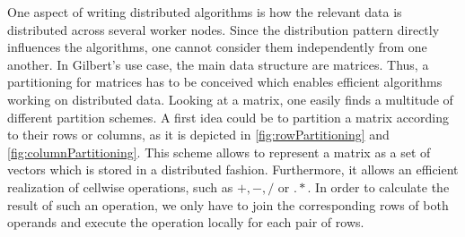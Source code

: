 One aspect of writing distributed algorithms is how the relevant data is distributed across several worker nodes. Since the distribution pattern directly influences the algorithms, one cannot consider them independently from one another. In Gilbert's use case, the main data structure are matrices. Thus, a partitioning for matrices has to be conceived which enables efficient algorithms working on distributed data. Looking at a matrix, one easily finds a multitude of different partition schemes. A first idea could be to partition a matrix according to their rows or columns, as it is depicted in \cref{fig:rowPartitioning} and \cref{fig:columnPartitioning}. This scheme allows to represent a matrix as a set of vectors which is stored in a distributed fashion.
Furthermore, it allows an efficient realization of cellwise operations, such as $+,-,/$ or $.*$. In order to calculate the result of such an operation, we only have to join the corresponding rows of both operands and execute the operation locally for each pair of rows.

